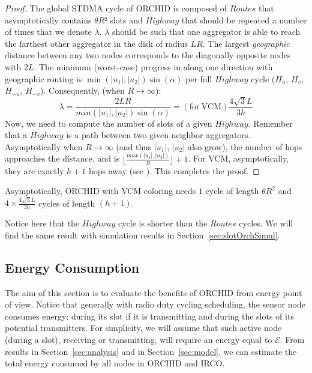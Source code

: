 \begin{proof}
The global STDMA cycle of ORCHID is composed of $Routes$ that asymptotically contains $\theta R²$ slots and $Highway$ that should be repeated a number of times that we denote $\lambda$. 
$\lambda$ should be such that one aggregator is able to reach the farthest other aggregator in the disk of radius $LR$. The largest \emph{geographic} distance between any two nodes corresponds to the diagonally opposite nodes with $2 L$. The minimum (worst-case) progress in along one direction with geographic routing is $\min(|u_1|,|u_2|) \sin(\alpha)$ per full $Highway$ cycle
 ($H_u$, $H_v$, $H_{-u}$, $H_{-v}$). Consequently, (when $R \rightarrow \infty$):
\begin{equation}
\lambda = \frac{2LR}{min(|u_1|,|u_2|) \sin(\alpha)} =\mathrm{(for~VCM)} \frac{4 \sqrt{3} L}{3h}
\end{equation} 
Now, we need to compute the number of slots of a given $Highway$. Remember that a $Highway$ is a path between two given neighbor aggregators. 
Asymptotically when $R \rightarrow \infty$ (and thus $|u_1|$, $|u_2|$ also 
grow), the number of hops approaches the distance, and is $\lfloor \frac{max(|u_1|,|u_2|) }{R}\rfloor + 1$.
For VCM, asymptotically, they are exactly $h+1$ hops away (see \cite{VCM}). 
This completes the proof.
\end{proof}

\begin{corollary}\label{coro:cycles}
Asymptotically, ORCHID with VCM coloring needs $1$ cycle of length $\theta R^2$ and $4 \times \frac{4 \sqrt{3} L}{3h}$ cycles of length $(h+1)$.
\end{corollary}

Notice here that the $Highway$ cycle is shorter than the $Routes$ cycles. We will find the same result with simulation results in Section~\ref{sec:slotOrchSimul}.

\subsection{Energy Consumption}\label{sec:energyCon}
The aim of this section is to evaluate the benefits of ORCHID from energy point of view. 
\newcommand{\cE}{\mathcal{E}}
Notice that generally with radio duty cycling scheduling, the sensor node consumes energy: during its slot if it is transmitting and during the slots of its potential transmitters. For simplicity, we will assume that such active node (during a slot), receiving or transmitting, will require an energy equal to $\cE$.
From results in Section~\ref{sec:analysis} and in Section~\ref{sec:model}, we can estimate the total energy consumed by all nodes in ORCHID and IRCO. \\

